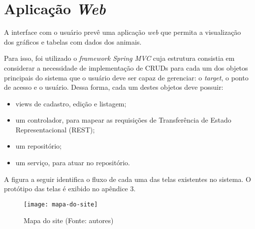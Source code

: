 \section{Aplicação \emph{Web}}

A interface com o usuário prevê uma aplicação \emph{web} que permita a visualização dos gráficos e tabelas com dados dos animais.

Para isso, foi utilizado o \emph{framework Spring MVC} cuja estrutura consistia em considerar a necessidade de implementação de CRUDs para cada um dos objetos principais do sistema que o usuário deve ser capaz de gerenciar: o \emph{target}, o ponto de acesso e o usuário. Dessa forma, cada um destes objetos deve possuir:

\begin{itemize}
	\item views de cadastro, edição e listagem;
	\item um controlador, para mapear as requisições de Transferência de Estado Representacional (REST);
	\item um repositório;
	\item um serviço, para atuar no repositório.
\end{itemize}

A figura a seguir identifica o fluxo de cada uma das telas existentes no sistema. O protótipo das telas é exibido no apêndice 3.

\begin{figure}[ht]
  \centering
    \texttt{[image: mapa-do-site]}
  \caption{Mapa do site (Fonte: autores)}
\end{figure}
\FloatBarrier
